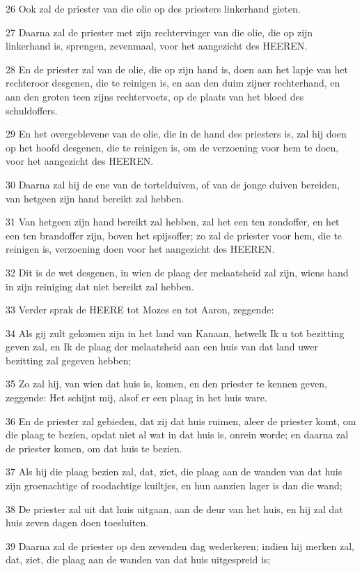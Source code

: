 \par 26 Ook zal de priester van die olie op des priesters linkerhand gieten.
\par 27 Daarna zal de priester met zijn rechtervinger van die olie, die op zijn linkerhand is, sprengen, zevenmaal, voor het aangezicht des HEEREN.
\par 28 En de priester zal van de olie, die op zijn hand is, doen aan het lapje van het rechteroor desgenen, die te reinigen is, en aan den duim zijner rechterhand, en aan den groten teen zijns rechtervoets, op de plaats van het bloed des schuldoffers.
\par 29 En het overgeblevene van de olie, die in de hand des priesters is, zal hij doen op het hoofd desgenen, die te reinigen is, om de verzoening voor hem te doen, voor het aangezicht des HEEREN.
\par 30 Daarna zal hij de ene van de tortelduiven, of van de jonge duiven bereiden, van hetgeen zijn hand bereikt zal hebben.
\par 31 Van hetgeen zijn hand bereikt zal hebben, zal het een ten zondoffer, en het een ten brandoffer zijn, boven het spijsoffer; zo zal de priester voor hem, die te reinigen is, verzoening doen voor het aangezicht des HEEREN.
\par 32 Dit is de wet desgenen, in wien de plaag der melaatsheid zal zijn, wiens hand in zijn reiniging dat niet bereikt zal hebben.
\par 33 Verder sprak de HEERE tot Mozes en tot Aaron, zeggende:
\par 34 Als gij zult gekomen zijn in het land van Kanaan, hetwelk Ik u tot bezitting geven zal, en Ik de plaag der melaatsheid aan een huis van dat land uwer bezitting zal gegeven hebben;
\par 35 Zo zal hij, van wien dat huis is, komen, en den priester te kennen geven, zeggende: Het schijnt mij, alsof er een plaag in het huis ware.
\par 36 En de priester zal gebieden, dat zij dat huis ruimen, aleer de priester komt, om die plaag te bezien, opdat niet al wat in dat huis is, onrein worde; en daarna zal de priester komen, om dat huis te bezien.
\par 37 Als hij die plaag bezien zal, dat, ziet, die plaag aan de wanden van dat huis zijn groenachtige of roodachtige kuiltjes, en hun aanzien lager is dan die wand;
\par 38 De priester zal uit dat huis uitgaan, aan de deur van het huis, en hij zal dat huis zeven dagen doen toesluiten.
\par 39 Daarna zal de priester op den zevenden dag wederkeren; indien hij merken zal, dat, ziet, die plaag aan de wanden van dat huis uitgespreid is;
